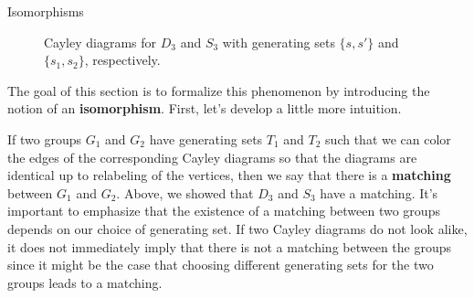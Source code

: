 \begin{section}{Isomorphisms}
\begin{figure}[!ht]
\centering
{}
\hspace{1cm}
\caption{Cayley diagrams for $D_3$ and $S_3$ with generating sets $\{s,s'\}$ and $\{s_1,s_2\}$, respectively.}
\label{fig:D3andS3}
\end{figure}

The goal of this section is to formalize this phenomenon by introducing the notion of an \textbf{isomorphism}. First, let's develop a little more intuition.

If two groups $G_1$ and $G_2$ have generating sets $T_1$ and $T_2$ such that we can color the edges of the corresponding Cayley diagrams so that the diagrams are identical up to relabeling of the vertices, then we say that there is a \textbf{matching} between $G_1$ and $G_2$.  Above, we showed that $D_3$ and $S_3$ have a matching.  It's important to emphasize that the existence of a matching between two groups depends on our choice of generating set.  If two Cayley diagrams do not look alike, it does not immediately imply that there is not a matching between the groups since it might be the case that choosing different generating sets for the two groups leads to a matching.


\end{section}
